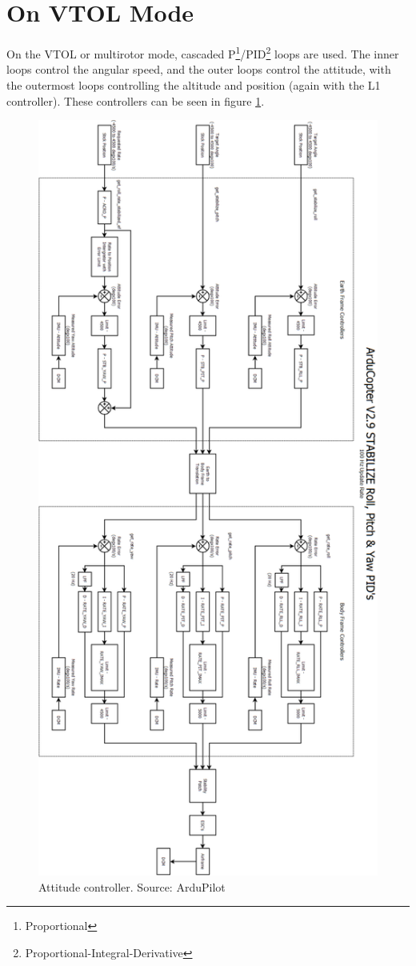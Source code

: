 \section{On VTOL Mode}
%
On the VTOL or multirotor mode, cascaded P\footnote{Proportional}/PID\footnote{Proportional-Integral-Derivative} loops are used.
The inner loops control the angular speed, and the outer loops control the attitude, with the outermost loops controlling the altitude and position (again with the L1 controller). These controllers can be seen in figure \ref{fig:copter_attitude_loops}.
\begin{figure}[H]
\centering
  \includegraphics[width=0.65\linewidth]{figs/copterpids.png}
  \caption{Attitude controller. Source: ArduPilot}
  \label{fig:copter_attitude_loops}
\end{figure}

